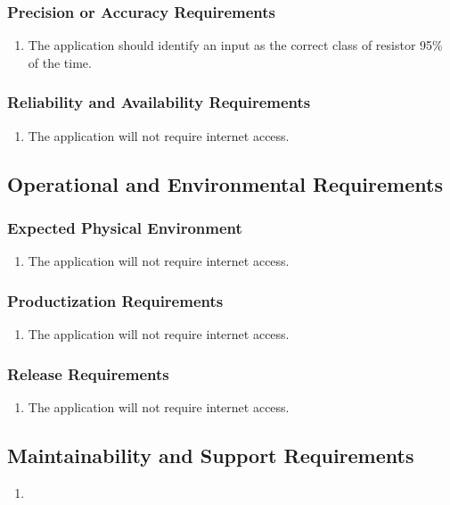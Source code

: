 \documentclass{article}
\begin{document}
\subsubsection{Precision or Accuracy Requirements}
\begin{enumerate}
\item The application should identify an input as the correct class of resistor 95\% of the time.
\end{enumerate}
\subsubsection{Reliability and Availability Requirements}
\begin{enumerate}
\item The application will not require internet access.
\end{enumerate}
\subsection{Operational and Environmental Requirements}
\subsubsection{Expected Physical Environment}
\begin{enumerate}
\item The application will not require internet access.
\end{enumerate}
\subsubsection{Productization Requirements}
\begin{enumerate}
\item The application will not require internet access.
\end{enumerate}
\subsubsection{Release Requirements}
\begin{enumerate}
\item The application will not require internet access.
\end{enumerate}
\subsection{Maintainability and Support Requirements}
\begin{enumerate}
\item
\end{enumerate}
\end{document}
